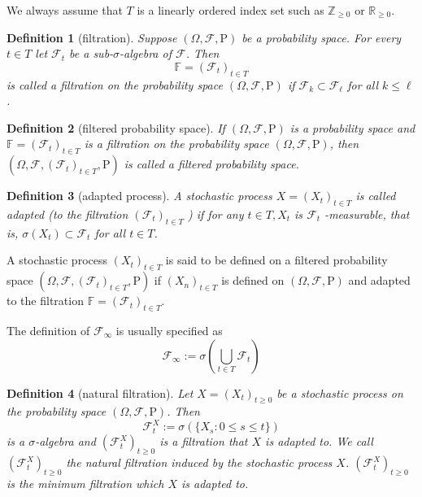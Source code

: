 \documentclass{report}
\newtheorem{definition}{Definition}[section]
\theoremstyle{nonumberplain}
\begin{document}
We always assume that $T$ is a linearly ordered index set such as $\mathbb{Z}_{\ge 0}$ or $\mathbb{R}_{\ge 0}$.
\begin{definition}[filtration]
	Suppose $(\Omega,\mathcal{F},\mathrm{P})$ be a probability space. For every $t\in T$ let $\mathcal{F}_{t}$ be a sub-$\sigma$-algebra of $\mathcal{F}$. Then
	\[
	\mathbb{F} =(\mathcal{F}_{t})_{t\in T}
	\]
	is called a \emph{filtration} on the probability space $(\Omega,\mathcal{F},\mathrm{P})$ if $\mathcal {F}_{k}\subset \mathcal{F}_{\ell}$ for all $k\leq \ell$. 
\end{definition}
\begin{definition}[filtered probability space]
	If $(\Omega,\mathcal{F},\mathrm{P})$ is a probability space and $ \mathbb {F}=(\mathcal{F}_{t})_{t\in T }$ is a filtration on the probability space $(\Omega,\mathcal{F},\mathrm{P})$, then $(\Omega,\mathcal{F},(\mathcal{F}_{t})_{t\in T },\mathrm{P})$ is called a \emph{filtered probability space}.
\end{definition}

\begin{definition}[adapted process]
	A stochastic process $X=(X_{t})_{t \in T}$ is called \emph{adapted} (to the filtration $(\mathcal{F}_{t})_{t\in T}$ ) if for any $t \in T, X_{t}$ is $\mathcal{F}_{t}$ -measurable, that is, $\sigma(X_t)\subset \mathcal{F}_t$ for all $t\in T$.
\end{definition}

A stochastic process $(X_{t})_{t\in T }$ is said to be defined on a filtered probability space $(\Omega,\mathcal{F},(\mathcal{F}_{t})_{t\in T },\mathrm{P})$ if $(X_{n})_{t\in T }$ is defined on $(\Omega,\mathcal{F},\mathrm{P})$ and adapted to the filtration $\mathbb{F} =(\mathcal{F}_{t})_{t\in T }$. 

The definition of $\mathcal{F}_{\infty}$ is usually specified as
\[
\mathcal{F}_{\infty}:=\sigma\left(\bigcup_{t\in T} \mathcal{F}_t\right)
\]

\begin{definition}[natural filtration]
	Let $X=(X_{t})_{t\ge 0}$ be a stochastic process on the probability space $(\Omega,\mathcal{F},\mathrm{P})$. Then 
	\[
	{\mathcal {F}}_{t}^X:=\sigma (\{X_{s}:0\le s\le t\})
	\]
	is a $\sigma$-algebra and $(\mathcal {F}_{t}^X)_{t\ge0} $ is a filtration that $X$ is adapted to. We call $(\mathcal {F}_{t}^X)_{t\ge0} $ the \emph{natural filtration} induced by the stochastic process $X$. $(\mathcal {F}_{t}^X)_{t\ge0} $ is the minimum filtration which $X$ is adapted to.
\end{definition}
\end{document}
